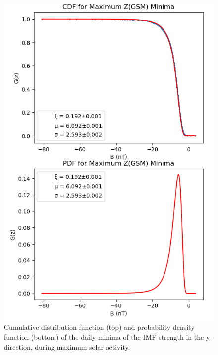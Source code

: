 \documentclass[12pt]{article}
\begin{document}
        \begin{figure}[t!]
            \begin{minipage}{0.48\textwidth}
                \centering
                \includegraphics[width=\textwidth]{fig_method/MFImaxZmin.png}
                \caption{Cumulative distribution function (top) and probability density function (bottom) of the daily minima of the IMF strength in the y-direction, during maximum solar activity.}
                \label{fig:MFImaxZmin}
            \end{minipage}
            \hfill
            \begin{minipage}{0.48\textwidth}
                \centering

\end{minipage}
\end{figure}
\end{document}
